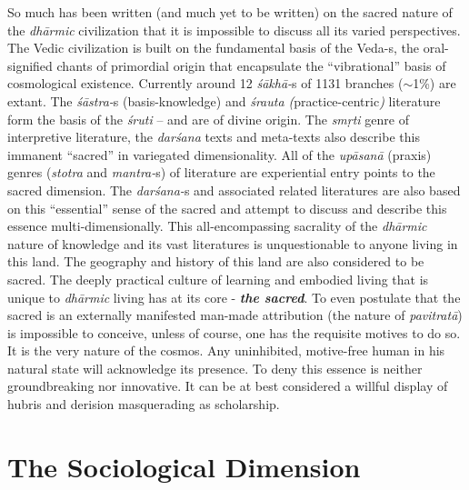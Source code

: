 So much has been written (and much yet to be written) on the sacred nature of the \textit{dhārmic} civilization that it is impossible to discuss all its varied perspectives. The Vedic civilization is built on the fundamental basis of the Veda-s, the oral-signified chants of primordial origin that encapsulate the “vibrational” basis of cosmological existence. Currently around 12 \textit{śākhā-}s of 1131 branches ($\sim$1\%) are extant. The \textit{śāstra-}s (basis-knowledge) and \textit{śrauta (}practice-centric\textit{)} literature form the basis of the \textit{śruti} – and are of divine origin. The \textit{smṛti} genre of interpretive literature, the \textit{darśana} texts and meta-texts also describe this immanent “sacred” in variegated dimensionality. All of the \textit{upāsanā} (praxis) genres (\textit{stotra} and \textit{mantra-}s) of literature are experiential entry points to the sacred dimension. The \textit{darśana-}s and associated related literatures are also based on this “essential” sense of the sacred and attempt to discuss and describe this essence multi-dimensionally. This all-encompassing sacrality of the \textit{dhārmic} nature of knowledge and its vast literatures is unquestionable to anyone living in this land. The geography and history of this land are also considered to be sacred. The deeply practical culture of learning and embodied living that is unique to \textit{dhārmic} living has at its core - \textbf{\textit{the sacred}}. To even postulate that the sacred is an externally manifested man-made attribution (the nature of \textit{pavitratā}) is impossible to conceive, unless of course, one has the requisite motives to do so. It is the very nature of the cosmos. Any uninhibited, motive-free human in his natural state will acknowledge its presence. To deny this essence is neither groundbreaking nor innovative. It can be at best considered a willful display of hubris and derision masquerading as scholarship.


\section*{The Sociological Dimension}

